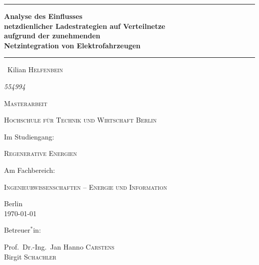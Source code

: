
\begin{titlepage}
	\centering
	\par\noindent\rule{\textwidth}{0.4pt}
	{\huge\bfseries Analyse des Einflusses\\
	netzdienlicher Ladestrategien auf Verteilnetze\\
	aufgrund der zunehmenden\\
	Netzintegration von Elektrofahrzeugen\par}
	\par\noindent\rule{\textwidth}{0.8pt}\par
	\vspace*{2cm}
	{\Large\ Kilian \textsc{Helfenbein}\par}
	{\large \textit{554994}\par}
	\vspace{1.5cm}
	{\scshape\LARGE Masterarbeit\par}
	\vspace{1.5cm}
	{\scshape\Large Hochschule für Technik und Wirtschaft Berlin \par}
	\vspace{1cm}
	Im Studiengang:\par
	{\scshape\large Regenerative Energien\par}
	\vspace{.5cm}
	Am Fachbereich:\par
	{\scshape\large Ingenieurwissenschaften {--} Energie und Information\par}
	\vfill
	{\large Berlin\\
	\today\par}
	\vfill
	{\large Betreuer$^*$in:\par
	Prof.~Dr.-Ing.~Jan Hanno \textsc{Carstens}\\
	Birgit \textsc{Schachler}}
\end{titlepage}
